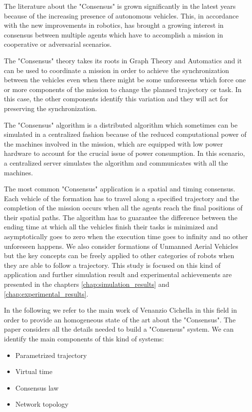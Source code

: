 The literature about the "Consensus" is grown significantly in the latest years
because of the increasing presence of autonomous vehicles. This, in accordance with
the new improvements in robotics, has brought a growing interest in consensus
between multiple agents which have to accomplish a mission in cooperative or adversarial
scenarios.

The "Consensus" theory takes its roots in Graph Theory and Automatics and it can
be used to coordinate a mission in order to achieve the synchronization between
the vehicles even when there might be some unforeseens which force one or more
components of the mission to change the planned trajectory or task. In this case,
the other components identify this variation and they will act for preserving the
synchronization.

The "Consensus" algorithm is a distributed algorithm which sometimes can be simulated
in a centralized fashion because of the reduced computational power of the machines
involved in the mission, which are equipped with low power hardware to account for
the crucial issue of power consumption.
In this scenario, a centralized server simulates the algorithm and communicates with
all the machines.

The most common "Consensus" application is a spatial and timing consensus.
Each vehicle of the formation has to travel along a specified trajectory and the
completion of the mission occurs when all the agents reach the final positions of their
spatial paths. The algorithm has to guarantee the difference between
the ending time at which all the vehicles finish their tasks is minimized and
asymptotically goes to zero when the execution time goes to infinity and no other
unforeseen happens.
We also consider formations of Unmanned Aerial Vehicles but the key concepts can
be freely applied to other categories of robots when they are able to follow a trajectory.
This study is focused on this kind of application and further
simulation result and experimental achievements are presented in the chapters
\ref{chap:simulation_results} and \ref{chap:experimental_results}.

In the following we refer to the main work of Venanzio Cichella in this field \cite{cichellaMain}
in order to provide an homogeneous state of the art about the "Consensus".
The paper considers all the details needed to build a "Consensus" system.
We can identify the main components of this kind of systems:
\begin{itemize}
  \item Parametrized trajectory
  \item Virtual time
  \item Consensus law
  \item Network topology
\end{itemize}












